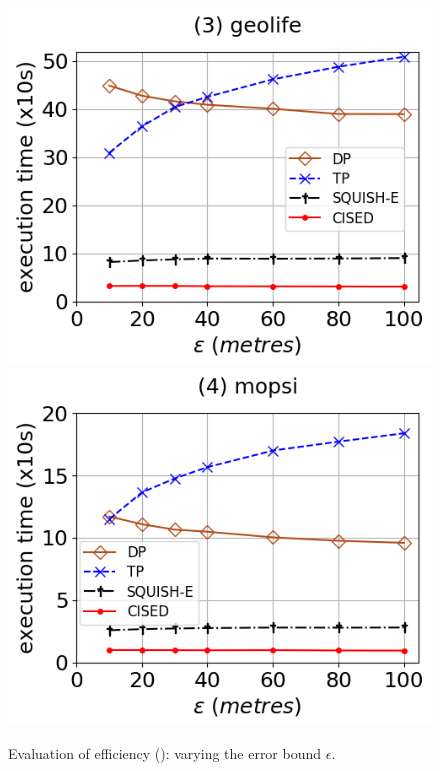 \begin{figure}[tb!]
	\includegraphics[scale=0.315]{Figures/Exp-SED-time-epsilon-geolife.png}	\hspace{1ex}
	\includegraphics[scale=0.315]{Figures/Exp-SED-time-epsilon-mopsi.png}	\hspace{1ex}
	\vspace{-2.5ex}
	\caption{\small Evaluation of efficiency (\sed): varying the error bound $\epsilon$.}\label{fig:time-epsilon-sed}
	\vspace{-2ex}
\end{figure}


